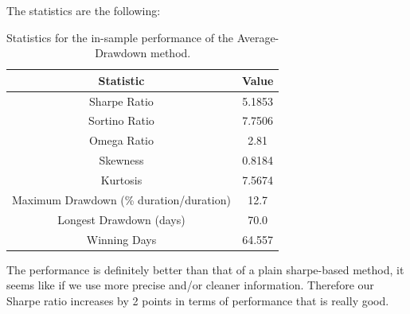 The statistics are the following:

\begin{table}
	\centering
	\begin{tabular}{c|c}
		\textbf{Statistic} & \textbf{Value} \\\hline
		Sharpe Ratio & 5.1853 \\ 
		Sortino Ratio & 7.7506 \\ 
		Omega Ratio & 2.81 \\ 
		Skewness & 0.8184 \\ 
		Kurtosis & 7.5674 \\ 
		Maximum Drawdown (\% duration/duration) & 12.7 \\ 
		Longest Drawdown (days) & 70.0 \\ 
		Winning Days & 64.557 \\ 
	\end{tabular}
	\caption{\label{tab:widgets} Statistics for the in-sample performance of the Average-Drawdown method.}
\end{table}

The performance is definitely better than that of a plain sharpe-based method, it seems like if we use more precise and/or cleaner information. Therefore our Sharpe ratio increases by 2 points in terms of performance that is really good. 